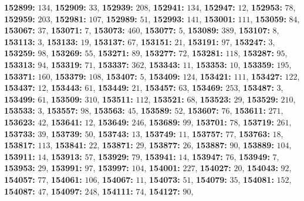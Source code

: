 \textsf{\bfseries 152899:} $134$, \textsf{\bfseries 152909:} $33$, \textsf{\bfseries 152939:} $208$, \textsf{\bfseries 152941:} $134$, \textsf{\bfseries 152947:} $12$, \textsf{\bfseries 152953:} $78$, \textsf{\bfseries 152959:} $203$, \textsf{\bfseries 152981:} $107$, \textsf{\bfseries 152989:} $51$, \textsf{\bfseries 152993:} $141$, \textsf{\bfseries 153001:} $111$, \textsf{\bfseries 153059:} $84$, \textsf{\bfseries 153067:} $37$, \textsf{\bfseries 153071:} $7$, \textsf{\bfseries 153073:} $460$, \textsf{\bfseries 153077:} $5$, \textsf{\bfseries 153089:} $389$, \textsf{\bfseries 153107:} $8$, \textsf{\bfseries 153113:} $3$, \textsf{\bfseries 153133:} $19$, \textsf{\bfseries 153137:} $67$, \textsf{\bfseries 153151:} $21$, \textsf{\bfseries 153191:} $97$, \textsf{\bfseries 153247:} $3$, \textsf{\bfseries 153259:} $98$, \textsf{\bfseries 153269:} $55$, \textsf{\bfseries 153271:} $89$, \textsf{\bfseries 153277:} $72$, \textsf{\bfseries 153281:} $118$, \textsf{\bfseries 153287:} $95$, \textsf{\bfseries 153313:} $94$, \textsf{\bfseries 153319:} $71$, \textsf{\bfseries 153337:} $362$, \textsf{\bfseries 153343:} $11$, \textsf{\bfseries 153353:} $10$, \textsf{\bfseries 153359:} $195$, \textsf{\bfseries 153371:} $160$, \textsf{\bfseries 153379:} $108$, \textsf{\bfseries 153407:} $5$, \textsf{\bfseries 153409:} $124$, \textsf{\bfseries 153421:} $111$, \textsf{\bfseries 153427:} $122$, \textsf{\bfseries 153437:} $12$, \textsf{\bfseries 153443:} $61$, \textsf{\bfseries 153449:} $21$, \textsf{\bfseries 153457:} $63$, \textsf{\bfseries 153469:} $253$, \textsf{\bfseries 153487:} $3$, \textsf{\bfseries 153499:} $61$, \textsf{\bfseries 153509:} $310$, \textsf{\bfseries 153511:} $112$, \textsf{\bfseries 153521:} $68$, \textsf{\bfseries 153523:} $29$, \textsf{\bfseries 153529:} $210$, \textsf{\bfseries 153533:} $3$, \textsf{\bfseries 153557:} $98$, \textsf{\bfseries 153563:} $45$, \textsf{\bfseries 153589:} $52$, \textsf{\bfseries 153607:} $76$, \textsf{\bfseries 153611:} $271$, \textsf{\bfseries 153623:} $42$, \textsf{\bfseries 153641:} $12$, \textsf{\bfseries 153649:} $246$, \textsf{\bfseries 153689:} $99$, \textsf{\bfseries 153701:} $78$, \textsf{\bfseries 153719:} $261$, \textsf{\bfseries 153733:} $39$, \textsf{\bfseries 153739:} $50$, \textsf{\bfseries 153743:} $13$, \textsf{\bfseries 153749:} $11$, \textsf{\bfseries 153757:} $77$, \textsf{\bfseries 153763:} $18$, \textsf{\bfseries 153817:} $113$, \textsf{\bfseries 153841:} $22$, \textsf{\bfseries 153871:} $29$, \textsf{\bfseries 153877:} $26$, \textsf{\bfseries 153887:} $90$, \textsf{\bfseries 153889:} $104$, \textsf{\bfseries 153911:} $14$, \textsf{\bfseries 153913:} $57$, \textsf{\bfseries 153929:} $79$, \textsf{\bfseries 153941:} $14$, \textsf{\bfseries 153947:} $76$, \textsf{\bfseries 153949:} $7$, \textsf{\bfseries 153953:} $29$, \textsf{\bfseries 153991:} $97$, \textsf{\bfseries 153997:} $104$, \textsf{\bfseries 154001:} $227$, \textsf{\bfseries 154027:} $20$, \textsf{\bfseries 154043:} $92$, \textsf{\bfseries 154057:} $77$, \textsf{\bfseries 154061:} $106$, \textsf{\bfseries 154067:} $11$, \textsf{\bfseries 154073:} $51$, \textsf{\bfseries 154079:} $35$, \textsf{\bfseries 154081:} $152$, \textsf{\bfseries 154087:} $47$, \textsf{\bfseries 154097:} $248$, \textsf{\bfseries 154111:} $74$, \textsf{\bfseries 154127:} $90$, 
